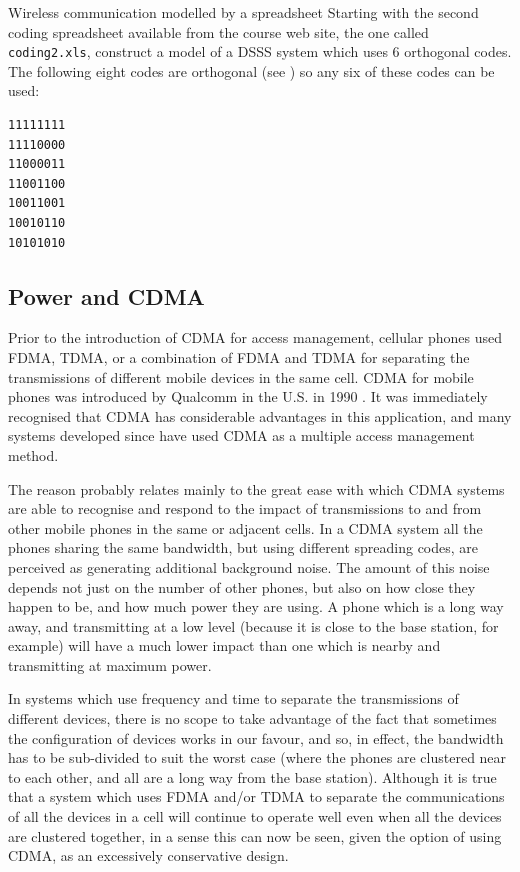 \begin{exercise}{Wireless communication modelled by a spreadsheet}
Starting with the second coding spreadsheet available from the course
web site, the one called \verb|coding2.xls|, construct a model of a
DSSS system which uses 6 orthogonal codes. The following eight codes
are orthogonal (see \cite{wolframwalsh}) so any six of these codes can
be used:

\begin{verbatim}
11111111
11110000
11000011
11001100
10011001
10010110
10101010
\end{verbatim}

\end{exercise}

\subsection{Power and CDMA}
Prior to the introduction of CDMA for access management, cellular
phones used FDMA, TDMA, or a combination of FDMA and TDMA for
separating the transmissions of different mobile devices in the same
cell. CDMA for mobile phones was introduced by Qualcomm in the U.S. in
1990 \cite{qualcommwiki}. It was immediately recognised that CDMA has
considerable advantages in this application, and many systems developed
since have used CDMA as a multiple access management method.

The reason probably relates mainly to the great ease with which CDMA
systems are able to recognise and respond to the impact of transmissions
to and from other mobile phones in the same or adjacent cells. In a CDMA
system all the phones sharing the same bandwidth, but using different
spreading codes, are perceived as generating additional background noise.
The amount of this noise depends not just on the number of other phones,
but also on how close they happen to be, and how much power they are
using. A phone which is a long way away, and transmitting at a low level
(because it is close to the base station, for example) will have a much
lower impact than one which is nearby and transmitting at maximum power.

In systems which use frequency and time to separate the transmissions
of different devices, there is no scope to take advantage of the fact
that sometimes the configuration of devices works in our favour, and so,
in effect, the bandwidth has to be sub-divided to suit the worst case
(where the phones are clustered near to each other, and all are a long
way from the base station). Although it is true that a system which
uses FDMA and/or TDMA to separate the communications of all the devices
in a cell will continue to operate well even when all the devices are
clustered together, in a sense this can now be seen, given the option
of using CDMA, as an excessively conservative design.


